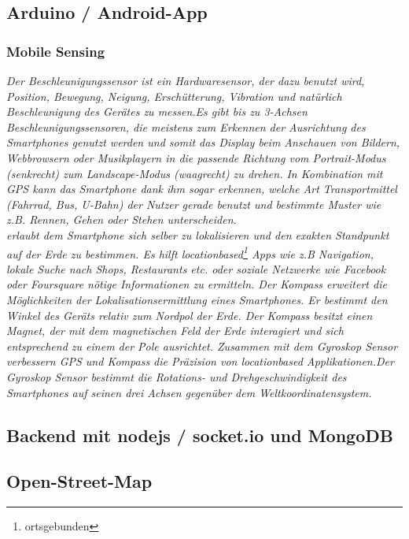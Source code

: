 \subsection{Arduino / Android-App}
\subsubsection{Mobile Sensing}
\textit{Der Beschleunigungssensor ist ein Hardwaresensor, der dazu benutzt wird, Position, Bewegung, Neigung, Erschütterung, Vibration und natürlich Beschleunigung des Gerätes zu messen.Es gibt bis zu 3-Achsen Beschleunigungssensoren, die meistens zum Erkennen der Ausrichtung des Smartphones genutzt werden und somit das Display beim Anschauen von Bildern, Webbrowsern oder Musikplayern in die passende Richtung vom Portrait-Modus (senkrecht) zum Landscape-Modus (waagrecht) zu drehen. In Kombination mit \gls{GPS} kann das Smartphone dank ihm sogar erkennen, welche Art Transportmittel (Fahrrad, Bus, U-Bahn) der Nutzer gerade benutzt und bestimmte Muster wie z.B. Rennen, Gehen oder Stehen unterscheiden.\\
 erlaubt dem Smartphone sich selber zu lokalisieren und den exakten Standpunkt auf der Erde zu bestimmen. Es hilft locationbased\footnote{ortsgebunden} Apps wie z.B Navigation, lokale Suche nach Shops, Restaurants etc. oder soziale Netzwerke wie Facebook oder Foursquare nötige Informationen zu ermitteln. Der Kompass erweitert die Möglichkeiten der Lokalisationsermittlung eines Smartphones. Er bestimmt den Winkel des Geräts relativ zum Nordpol der Erde. Der Kompass besitzt einen Magnet, der mit dem magnetischen Feld der Erde interagiert und sich entsprechend zu einem der Pole ausrichtet. Zusammen mit dem Gyroskop Sensor verbessern \gls{GPS} und Kompass die Präzision von locationbased Applikationen.Der Gyroskop Sensor bestimmt die Rotations- und Drehgeschwindigkeit des Smartphones auf seinen drei Achsen gegenüber dem Weltkoordinatensystem.}
\subsection{Backend mit nodejs / socket.io und MongoDB}
\subsection{Open-Street-Map}
